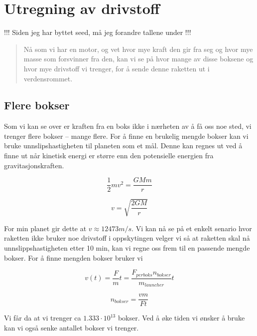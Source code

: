 \documentclass[a4paper,norsk,11pt,twoside]{article}
\begin{document}
\section{Utregning av drivstoff}

!!! Siden jeg har byttet seed, må jeg forandre tallene under !!!

\begin{abstract}
Nå som vi har en motor, og vet hvor mye kraft den gir fra seg og hvor mye masse som forsvinner fra den, kan vi se på hvor mange av disse boksene og hvor mye drivstoff vi trenger, for å sende denne raketten ut i verdensrommet.
\end{abstract}

\subsection{Flere bokser}
Som vi kan se over er kraften fra en boks ikke i nærheten av å få oss noe sted, vi trenger flere bokser -- mange flere. For å finne en brukelig mengde bokser kan vi bruke unnslipshastigheten til planeten som et mål. Denne kan regnes ut ved å finne ut når kinetisk energi er større enn den potensielle energien fra gravitasjonskraften.

\begin{equation}
\frac{1}{2}m v^{2} = \frac{GMm}{r}
\end{equation}

\begin{equation}
v = \sqrt{\frac{2GM}{r}}
\end{equation}

For min planet gir dette at $v \approx 12473 m/s$. Vi kan nå se på et enkelt senario hvor raketten ikke bruker noe drivstoff i oppskytingen velger vi så at raketten skal nå unnslippshastigheten etter 10 min, kan vi regne oss frem til en passende mengde bokser. For å finne mengden bokser bruker vi

\begin{equation}
v(t) = \frac{F}{m} t = \frac{F_{per boks}n_{bokser}}{m_{launcher}} t
\end{equation}

\begin{equation}
n_{bokser} = \frac{v m}{F t}
\end{equation}

Vi får da at vi trenger ca $1.333\cdot 10^{13}$ bokser. Ved å øke tiden vi ønsker å bruke kan vi også senke antallet bokser vi trenger.\\
\end{document}
